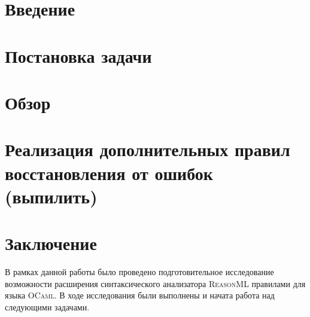 
\usepackage{newfloat,caption,float}
\usepackage{newfloat}
\usepackage{subcaption}
\usepackage{listings}

\captionsetup[example]{labelfont=bf}


\captionsetup[subexample]{labelformat=simple}

\newcommand{\ReasonML}{\textsc{ReasonML}}
\newcommand{\OCaml}{\textsc{OCaml}}
\newcommand{\ocamllex}{\textsc{ocamllex}}
\newcommand{\ocamlyacc}{\textsc{ocamlyacc}}
\newcommand{\merlin}{\textsc{merlin}}





\maketitle
\setcounter{tocdepth}{2}
\tableofcontents

\section{Введение}


\section{Постановка задачи}
\label{sec:task}


\section{Обзор}


\section{Реализация дополнительных правил восстановления от ошибок (выпилить)}


\section{Заключение}
В рамках данной работы было проведено подготовительное исследование возможности расширения синтаксического анализатора \ReasonML{} правилами для языка \OCaml{}. В ходе исследования были выполнены и начата работа над следующими задачами.


